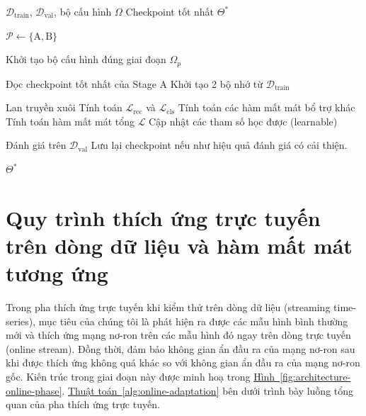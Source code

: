 \begin{algorithm}[H]
\caption{Pha tiền huấn luyện ngoại tuyến}
\label{alg:offline-pretraining}
\begin{algorithmic}[1]

\Require $\mathcal{D}_{\mathrm{train}}$, $\mathcal{D}_{\mathrm{val}}$, bộ cấu hình $\Omega$
\Ensure Checkpoint tốt nhất $\Theta^{*}$

\State $\mathcal{P} \gets \{\mathrm{A},\mathrm{B}\}$

    \State Khởi tạo bộ cấu hình đúng giai đoạn $\Omega_p$

        \State Đọc checkpoint tốt nhất của Stage A
        \State Khởi tạo 2 bộ nhớ từ $\mathcal{D}_{\mathrm{train}}$
    \EndIf

            \State Lan truyền xuôi
            \State Tính toán $\mathcal{L}_{\mathrm{rec}}$ và $\mathcal{L}_{\mathrm{cls}}$
            \State Tính toán các hàm mất mát bổ trợ khác
            \State Tính toán hàm mất mát tổng $\mathcal{L}$
            \State Cập nhật các tham số học được (learnable)
        \EndFor

        \State Đánh giá trên $\mathcal{D}_{\mathrm{val}}$
        \State Lưu lại checkpoint nếu như hiệu quả đánh giá có cải thiện.
    \EndFor
\EndFor

\State \Return $\Theta^{*}$

\end{algorithmic}
\end{algorithm}

\section{Quy trình thích ứng trực tuyến trên dòng dữ liệu và hàm mất mát tương ứng}
Trong pha thích ứng trực tuyến khi kiểm thử trên dòng dữ liệu (streaming time-series), mục tiêu của chúng tôi là phát hiện ra được các mẫu hình bình thường mới và thích ứng mạng nơ-ron trên các mẫu hình đó ngay trên dòng trực tuyến (online stream). Đồng thời, đảm bảo không gian ẩn đầu ra của mạng nơ-ron sau khi được thích ứng không quá khác so với không gian ẩn đầu ra của mạng nơ-ron gốc. Kiến trúc trong giai đoạn này được minh hoạ trong \hyperref[fig:architecture-online-phase]
{Hình~\ref*{fig:architecture-online-phase}}. \hyperref[alg:online-adaptation]{Thuật toán~\ref*{alg:online-adaptation}} bên dưới trình bày luồng tổng quan của pha thích ứng trực tuyến.

